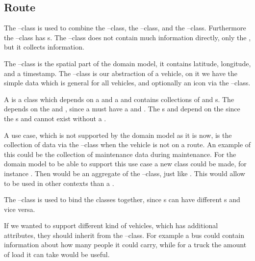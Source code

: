 \subsection{Route}
The --class is used to combine the --class, the --class, and the --class.
Furthermore the --class has s.
The --class does not contain much information directly, only the , but it collects information.

The --class is the spatial part of the domain model, it contains latitude, longitude, and a timestamp.
The --class is our abstraction of a vehicle, on it we have the simple data which is general for all vehicles, and optionally an icon via the --class.

A  is a class which depends on a  and a  and contains collections of  and s.
The  depends on the  and , since a  must have a  and .
The s and  depend on the  since the s and  cannot exist without a .

A use case, which is not supported by the domain model as it is now, is the collection of data via the --class when the vehicle is not on a route.
An example of this could be the collection of maintenance data during maintenance.
For the domain model to be able to support this use case a new class could be made, for instance .
Then  would be an aggregate of the --class, just like .
This would allow  to be used in other contexts than a .

The --class is used to bind the classes together, since s can have different s and vice versa.

If we wanted to support different kind of vehicles, which has additional attributes, they should inherit from the --class.
For example a bus could contain information about how many people it could carry, while for a truck the amount of load it can take would be useful. 

